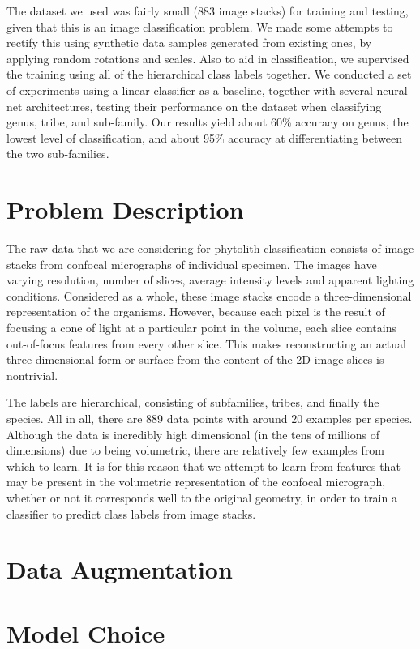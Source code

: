 \documentclass{article}
\begin{document}
The dataset we used was fairly small (883 image stacks) for training and testing, given that this is an image classification problem. We made some attempts to rectify this using synthetic data samples generated from existing ones, by applying random rotations and scales. Also to aid in classification, we supervised the training using all of the hierarchical class labels together. We conducted a set of experiments using a linear classifier as a baseline, together with several neural net architectures, testing their performance on the dataset when classifying genus, tribe, and sub-family. Our results yield about 60\% accuracy on genus, the lowest level of classification, and about 95\% accuracy at differentiating between the two sub-families.

\section{Problem Description}

The raw data that we are considering for phytolith classification consists of image stacks from confocal micrographs of individual specimen. The images have varying resolution, number of slices, average intensity levels and apparent lighting conditions. Considered as a whole, these image stacks encode a three-dimensional representation of the organisms. However, because each pixel is the result of focusing a cone of light at a particular point in the volume, each slice contains out-of-focus features from every other slice. This makes reconstructing an actual three-dimensional form or surface from the content of the 2D image slices is nontrivial.

The labels are hierarchical, consisting of subfamilies, tribes, and finally the species. All in all, there are 889 data points with around 20 examples per species. Although the data is incredibly high dimensional (in the tens of millions of dimensions) due to being volumetric, there are relatively few examples from which to learn. It is for this reason that we attempt to learn from features that may be present in the volumetric representation of the confocal micrograph, whether or not it corresponds well to the original geometry, in order to train a classifier to predict class labels from image stacks.


\section{Data Augmentation}

\section{Model Choice}
\end{document}
